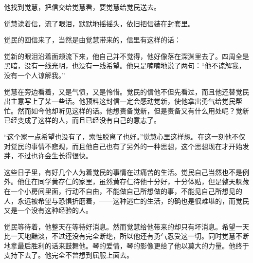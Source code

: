\par 他找到觉慧，把信交给觉慧看，要觉慧给觉民送去。
\par 觉慧读着信，流了眼泪，默默地摇摇头，依旧把信装在封套里。
\par 觉民的回信来了，当然是由觉慧带来的，信里有这样的话：
\par 觉新的眼泪沿着面颊流下来，他自己并不觉得，他好像落在深渊里去了。四周全是黑暗，没有一线光明，也没有一线希望。他只是喃喃地说了两句：“他不谅解我，没有一个人谅解我。”
\par 觉慧在旁边看着，又是气愤，又是怜惜。觉民的信他不但先看过，而且他还替觉民出主意写上了某一些话。他预料这封信一定会感动觉新，使他拿出勇气给觉民帮忙。然而如今他却听见这样的话。他想责备觉新，但是责备又有什么用处呢？觉新已经变成了这样的人，而且已经没有自己的意志了。
\par “这个家一点希望也没有了，索性脱离了也好。”觉慧心里这样想。在这一刻他不仅对觉民的事情不悲观，而且他自己也有了另外的一种思想，这个思想现在才开始发芽，不过也许会生长得很快。
\par 这些日子里，有好几个人为着觉民的事情在过痛苦的生活。觉民自己当然也不是例外。他住在同学黄存仁的家里，虽然黄存仁待他十分好，十分体贴，但是整天躲藏在一个小房间里面，行动不自由，不能做自己所想做的事，不能见自己所想见的人，永远被希望与恐惧折磨着，——这种逃亡的生活，的确也是很难堪的，而觉民又是一个没有这种经验的人。
\par 觉民等待着，他整天在等待好消息。然而觉慧给他带来的却只有坏消息。希望一天比一天地黯淡，不过还没有完全断绝，所以他还有勇气忍受这一切。同时觉慧不断地拿最后胜利的话来鼓舞他。琴的爱情，琴的影像更给了他以莫大的力量。他终于支持下去了。他完全不曾想到屈服上面去。
